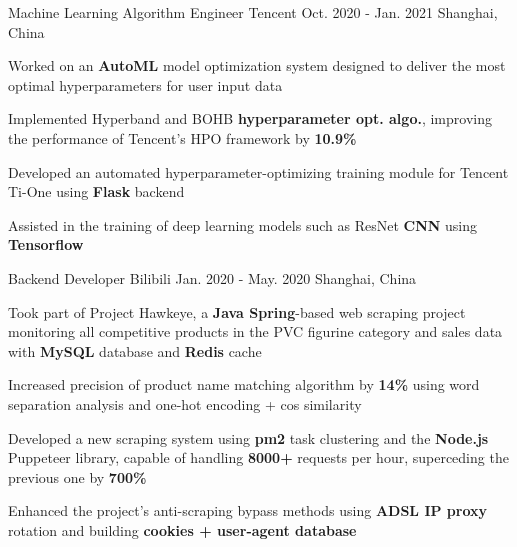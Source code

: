 

\begin{cventries}

  \cventry
    {Machine Learning Algorithm Engineer} %
    {Tencent} %
    {Oct. 2020 - Jan. 2021} %
    {Shanghai, China} %
    {
      \begin{cvitems} %
        \item {Worked on an \textbf{AutoML} model optimization system designed to deliver the most optimal hyperparameters for user input data}
        \item {Implemented Hyperband and BOHB \textbf{hyperparameter opt. algo.}, improving the performance of Tencent's HPO framework by \textbf{10.9\%}}
        \item {Developed an automated hyperparameter-optimizing training module for Tencent Ti-One using \textbf{Flask} backend}
        \item {Assisted in the training of deep learning models such as ResNet \textbf{CNN} using \textbf{Tensorflow}}
      \end{cvitems}
    }

  \cventry
    {Backend Developer} %
    {Bilibili} %
    {Jan. 2020 - May. 2020} %
    {Shanghai, China} %
    {
      \begin{cvitems} %
        \item {Took part of Project Hawkeye, a \textbf{Java Spring}-based web scraping project monitoring all competitive products in the PVC figurine category and sales data with \textbf{MySQL} database and \textbf{Redis} cache}
        \item {Increased precision of product name matching algorithm by \textbf{14\%} using word separation analysis and one-hot encoding + cos similarity}
        \item {Developed a new scraping system using \textbf{pm2} task clustering and the \textbf{Node.js} Puppeteer library, capable of handling \textbf{8000+} requests per hour, superceding the previous one by \textbf{700\%}}
        \item {Enhanced the project's anti-scraping bypass methods using \textbf{ADSL IP proxy} rotation and building \textbf{cookies + user-agent database}}
      \end{cvitems}
    }


\end{cventries}
